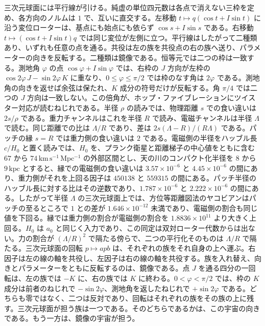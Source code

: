 \documentclass[a4paper]{article}
\begin{document}
三次元球面には平行線が引ける。純虚の単位四元数は各点で消えない三枠を定め、各方向のノルムは \(1\) で、互いに直交する。左移動 \(t\mapsto q(\cos t+I\sin t)\) に沿う変位ローターは、基点にも始点にも依らず \(\cos s+I\sin s\) である。右移動 \(t\mapsto(\cos t+I\sin t)q\) では同じ変位が左側に立つ。平行線はしたがって二種類あり、いずれも任意の点を通る。共役は左の族を共役点の右の族へ送り、パラメーターの向きを反転する。二種類は鏡像である。恒等元では二つの枠は一致する。測地角 \(\varphi\) の点 \(\cos\varphi+I\sin\varphi\) では、右枠の \(J\) 方向が左枠の \(\cos 2\varphi\, J-\sin 2\varphi\, K\) に重なり、\(0\le\varphi\le\pi/2\) では枠のなす角は \(2\varphi\) である。測地角の向きを返せば余弦は保たれ、\(K\) 成分の符号だけが反転する。角 \(\pi/4\) では二つの \(J\) 方向は一致しない。この倍角が、ホップ・ファイブレーションにツイスター対応が読むねじれである。半径 \(\rho\) の読みでは、物理距離 \(s\) での食い違いは \(2s/\rho\) である。重力チャンネルはこれを半径 \(R\) で読み、電磁チャンネルは半径 \(\Lambda\) で読む。同じ距離での比は \(\Lambda/R\) であり、差は \(2s(\Lambda-R)/(R\Lambda)\) である。パッチの縁 \(s=R\) では重力側の食い違いは \(2\) である。電磁側の半径をハッブル長 \(c/H_0\) と置く読みでは、\(H_0\) を、プランク衛星と距離梯子の中心値をともに含む \(67\) から \(74\,\mathrm{km\,s^{-1}\,Mpc^{-1}}\) の外部区間とし、天の川のコンパクト化半径を \(8\) から \(9\,\mathrm{kpc}\) とすると、縁での電磁側の食い違いは \(3.57\times 10^{-6}\) と \(4.45\times 10^{-6}\) の間にあり、重力側がそれを上回る因子は \(450138\) と \(559315\) の間にある。パッチ半径のハッブル長に対する比はその逆数であり、\(1.787\times 10^{-6}\) と \(2.222\times 10^{-6}\) の間にある。したがって半径 \(\Lambda\) の三次元球面上では、方位等距離図法のヤコビアンはパッチの至るところで \(1\) との差が \(1.646\times 10^{-12}\) 未満であり、電磁側の割合も同じ値を下回る。縁では重力側の割合が電磁側の割合を \(1.8836\times 10^{11}\) より大きく上回る。\(H_0\) は \(a_0\) と同じく入力であり、この同定は双対ローター代数からは出ない。力の割合が \((\Lambda/R)^2\) で隔たる傍らで、二つの平行化そのものは \(\Lambda/R\) で隔たる。三次元球面の回転 \(p\mapsto apb\) は、それぞれの族をそれ自身の上へ運ぶ。右因子は左の線の軸を共役し、左因子は右の線の軸を共役する。族を入れ替え、向きとパラメーターをともに反転するのは、鏡像である。点 \(J\) を通る四分の一回転は、左の族では \(-K\) に、右の族では \(K\) に終わる。\(0<\varphi<\pi/2\) では、枠の \(K\) 成分は前者のねじれで \(-\sin 2\varphi\)、測地角を返したねじれで \(+\sin 2\varphi\) である。どちらも零ではなく、二つは反対であり、回転はそれぞれの族をその族の上に残す。三次元球面が担う族は一つである。そのどちらであるかは、この宇宙の向きである。もう一方は、鏡像の宇宙が担う。
\end{document}
